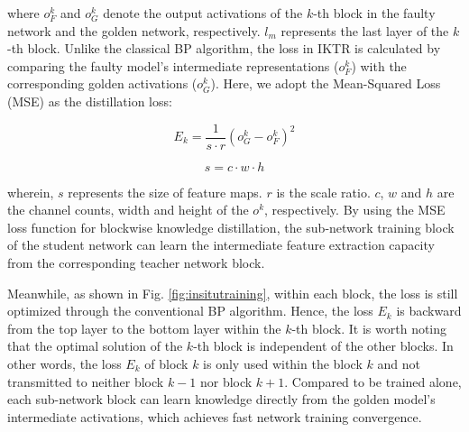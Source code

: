 where $o_F^k$ and $o_G^k$ denote the output activations of the $k$-th block in the faulty network and the golden network, respectively. $l_m$ represents the last layer of the $k$-th block. Unlike the classical BP algorithm, the loss in IKTR is calculated by comparing the faulty model's intermediate representations ($o_F^k$)  with the corresponding golden activations ($o_G^k$). Here, we adopt the Mean-Squared Loss (MSE) as the distillation loss: 

\begin{equation}
    {E_k} = \frac{1}{{s \cdot r}}{(o_G^k - o_F^k)^2}
    \label{equ::MSE}
\end{equation}

\begin{equation}
    s = c \cdot w \cdot h
\end{equation}

wherein, $s$ represents the size of feature maps.  $r$ is the scale ratio. $c$, $w$ and $h$ are the channel counts, width and height of the $o^k$, respectively. By using the MSE loss function for blockwise knowledge distillation, the sub-network training block of the  student network can learn the intermediate feature extraction capacity from the corresponding teacher network block.                                                                              

Meanwhile, as shown in Fig. \ref{fig:insitutraining}, within each block, the loss is still optimized through the conventional BP algorithm. Hence, the loss ${E_k}$ is backward from the top layer to the bottom layer within the $k$-th block. It is worth noting that the optimal solution of the $k$-th block is independent of the other blocks. In other words, the loss ${E_k}$ of block $k$ is only used within the block $k$ and not transmitted to neither block $k-1$ nor block $k+1$. Compared to be trained alone, each sub-network block can learn knowledge directly from the golden model's intermediate activations, which achieves fast network training convergence.


